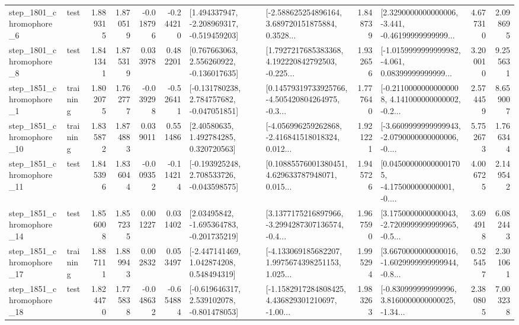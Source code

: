 \begin{tabular}{llrrrrllrlrr}
  step\_1801\_chromophore\_6 &      test &      1.889315 &    1.870519 &     -0.018796 & -0.244210 &   [1.494337947, -2.208969317, -0.519459203] &  [-2.588625254896164, 3.689720151875884, 0.3528... &       1.848739 &  [2.3290000000000006, -3.441, -0.46199999999999... &            4.677310 &          2.098695 \\
  step\_1801\_chromophore\_8 &      test &      1.841341 &    1.875319 &      0.033978 &  0.482201 &    [0.767663063, 2.556260922, -0.136017635] &  [1.7927217685383368, 4.192220842792503, -0.225... &       1.932656 &  [-1.0159999999999982, -4.061, 0.08399999999999... &            3.200010 &          9.255631 \\
  step\_1851\_chromophore\_1 &  training &      1.802075 &    1.762777 &     -0.039298 & -0.526411 &   [-0.131780238, 2.784757682, -0.047051851] &  [0.14579319733925766, -4.505420804264975, -0.3... &       1.777640 &  [-0.21100000000000008, 4.141000000000002, -0.2... &            2.574459 &          8.659007 \\
 step\_1851\_chromophore\_10 &  training &      1.835872 &    1.874883 &      0.039011 &  0.551486 &      [2.40580635, 1.492784285, 0.320720563] &  [-4.056996259262868, -2.416841518018324, 0.012... &       1.921221 &  [-3.6609999999999943, -2.0790000000000006, -0.... &            5.752673 &          1.766344 \\
 step\_1851\_chromophore\_11 &      test &      1.845396 &    1.836044 &     -0.009352 & -0.114214 &   [-0.193925248, 2.708533726, -0.043598575] &  [0.10885576001380451, 4.629633787948071, 0.015... &       1.945726 &  [0.045000000000001705, -4.175000000000001, -0.... &            4.006725 &          2.149542 \\
 step\_1851\_chromophore\_14 &      test &      1.856008 &    1.857235 &      0.001227 &  0.031402 &    [2.03495842, -1.695364783, -0.201735219] &  [3.1377175216897966, -3.2994287307136574, -0.4... &       1.967590 &  [3.1750000000000043, -2.7209999999999965, -0.5... &            3.694918 &          6.082443 \\
 step\_1851\_chromophore\_17 &  training &      1.887111 &    1.889943 &      0.002832 &  0.053497 &    [-2.447141469, 1.042874208, 0.548494319] &  [-4.133069185682207, 1.9975674398251153, 1.025... &       1.995294 &  [3.6670000000000016, -1.6029999999999944, -0.8... &            0.525457 &          2.301061 \\
 step\_1851\_chromophore\_18 &      test &      1.824470 &    1.775838 &     -0.048632 & -0.654884 &   [-0.619646317, 2.539102078, -0.801478053] &  [-1.1582917284808425, 4.436829301210697, -1.00... &       1.983263 &  [-0.830999999999996, 3.8160000000000025, -1.34... &            2.380805 &          7.003238 \\

\end{tabular}
